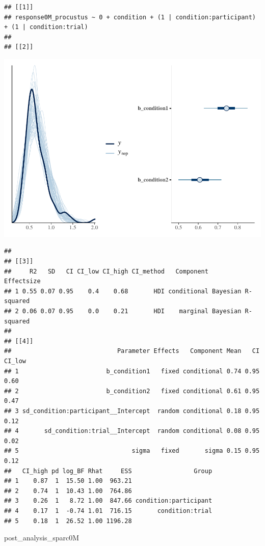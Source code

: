 \documentclass[
]{article}
\newenvironment{Shaded}{\begin{snugshade}}{\end{snugshade}}
\newcommand{\NormalTok}[1]{#1}
\begin{document}
\begin{verbatim}
## [[1]]
## response0M_procustus ~ 0 + condition + (1 | condition:participant) + (1 | condition:trial) 
## 
## [[2]]
\end{verbatim}

\includegraphics{08_Publish_GUSO_ASIL_files/figure-latex/Diagnostiics0M-1.pdf}

\begin{verbatim}
## 
## [[3]]
##     R2   SD   CI CI_low CI_high CI_method   Component         Effectsize
## 1 0.55 0.07 0.95    0.4    0.68       HDI conditional Bayesian R-squared
## 2 0.06 0.07 0.95    0.0    0.21       HDI    marginal Bayesian R-squared
## 
## [[4]]
##                             Parameter Effects   Component Mean   CI CI_low
## 1                        b_condition1   fixed conditional 0.74 0.95   0.60
## 2                        b_condition2   fixed conditional 0.61 0.95   0.47
## 3 sd_condition:participant__Intercept  random conditional 0.18 0.95   0.12
## 4       sd_condition:trial__Intercept  random conditional 0.08 0.95   0.02
## 5                               sigma   fixed       sigma 0.15 0.95   0.12
##   CI_high pd log_BF Rhat     ESS                 Group
## 1    0.87  1  15.50 1.00  963.21                      
## 2    0.74  1  10.43 1.00  764.86                      
## 3    0.26  1   8.72 1.00  847.66 condition:participant
## 4    0.17  1  -0.74 1.01  716.15       condition:trial
## 5    0.18  1  26.52 1.00 1196.28
\end{verbatim}

\begin{Shaded}
\begin{Highlighting}[]
\NormalTok{post\_analysis\_sparc0M}
\end{Highlighting}
\end{Shaded}
\end{document}
